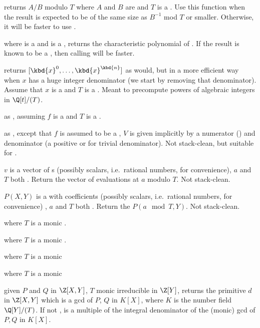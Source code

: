  returns $A/B$ modulo $T$
where $A$ and $B$ are  and $T$ is a . Use this function
when the result is expected to be of the same size as $B^{-1}$ mod $T$
or smaller.
Otherwise, it will be faster to use .

 where  is a  and
 is a , returns the characteristic polynomial of .
If the result is known to be a , then calling  will
be faster.

 returns $[\kbd{x}^0, \dots,
\kbd{x}^\kbd{n}]$ as  would, but in a more efficient way when
$x$ has a huge integer denominator (we start by removing that denominator).
Assume that $x$ is a  and $T$ is a . Meant to precompute
powers of algebraic integers in $\Q[t]/(T)$.

 as , assuming $f$
is a  and $T$ is a .

 as ,
except that $f$ is assumed to be a , $V$ is given implicitly
by a numerator  () and denominator  (a positive
 or  for trivial denominator). Not stack-clean, but
suitable for .

 $v$ is a vector of s
(possibly scalars, i.e.~rational numbers, for convenience), $a$ and $T$ both
. Return the vector of evaluations at $a$ modulo $T$.
Not stack-clean.

 $P(X,Y)$ is a  with
 coefficients (possibly scalars, i.e.~rational numbers, for
convenience) , $a$ and $T$ both . Return the  $P(a \mod
T, Y)$. Not stack-clean.


 where $T$ is a monic .

 where $T$ is a monic .

 where $T$ is a monic 

 where $T$ is a monic 

 given $P$ and $Q$ in
$\Z[X,Y]$, $T$ monic irreducible in $\Z[Y]$, returns the primitive $d$ in
$\Z[X,Y]$ which is a gcd of $P$, $Q$ in $K[X]$, where $K$ is the number field
$\Q[Y]/(T)$. If not ,  is a multiple of the integral
denominator of the (monic) gcd of $P,Q$ in $K[X]$.

